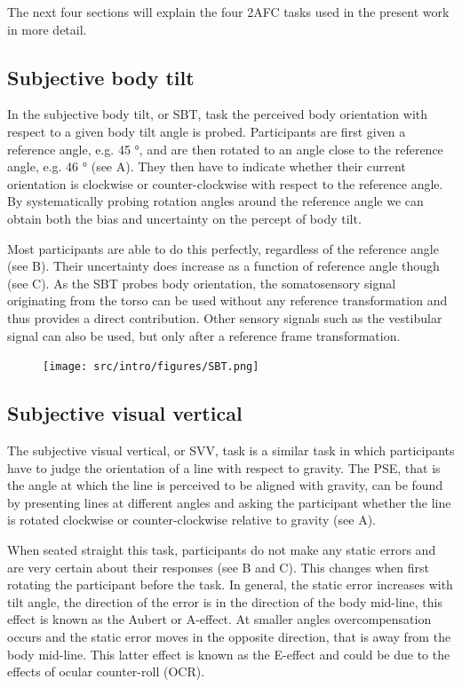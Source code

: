 The next four sections will explain the four 2AFC tasks used in the present work in more detail.

\subsection{Subjective body tilt}
In the subjective body tilt, or SBT, task the perceived body orientation with respect to a given body tilt angle is probed. Participants are first given a reference angle, e.g. 45 \si{\degree}, and are then rotated to an angle close to the reference angle, e.g. 46 \si{\degree} (see A). They then have to indicate whether their current orientation is clockwise or counter-clockwise with respect to the reference angle. By systematically probing rotation angles around the reference angle we can obtain both the bias and uncertainty on the percept of body tilt.

Most participants are able to do this perfectly, regardless of the reference angle (see B). Their uncertainty does increase as a function of reference angle though (see C).
As the SBT probes body orientation, the somatosensory signal originating from the torso can be used without any reference transformation and thus provides a direct contribution. Other sensory signals such as the vestibular signal can also be used, but only after a reference frame transformation.

\begin{figure}
    \texttt{[image: src/intro/figures/SBT.png]}

    \caption{}
    \label{intro:fig4}
\end{figure}


\subsection{Subjective visual vertical}
The subjective visual vertical, or SVV, task is a similar task in which participants have to judge the orientation of a line with respect to gravity. The PSE, that is the angle at which the line is perceived to be aligned with gravity, can be found by presenting lines at different angles and asking the participant whether the line is rotated clockwise or counter-clockwise relative to gravity (see A).

When seated straight this task, participants do not make any static errors and are very certain about their responses (see B and C). This changes when first rotating the participant before the task. In general, the static error increases with tilt angle, the direction of the error is in the direction of the body mid-line, this effect is known as the Aubert or A-effect. At smaller angles overcompensation occurs and the static error moves in the opposite direction, that is away from the body mid-line. This latter effect is known as the E-effect and could be due to the effects of ocular counter-roll (OCR).

